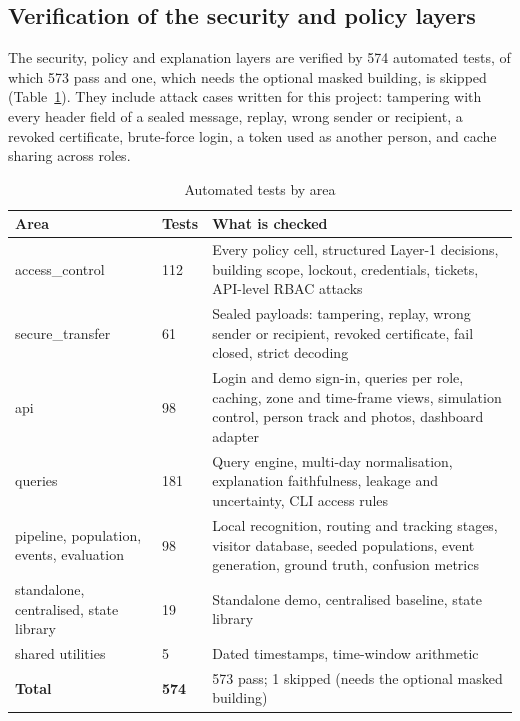 \documentclass[12pt,a4paper,oneside]{report}
\begin{document}
\subsection{Verification of the security and policy layers}\label{sec:res-security}
The security, policy and explanation layers are verified by 574 automated tests, of which 573 pass and one, which needs the optional masked building, is skipped (Table~\ref{tab:tests}). They include attack cases written for this project: tampering with every header field of a sealed message, replay, wrong sender or recipient, a revoked certificate, brute-force login, a token used as another person, and cache sharing across roles.

\begin{table}[htbp]
\centering
\caption{Automated tests by area}\label{tab:tests}
{\small\setlength{\tabcolsep}{4pt}\renewcommand{\arraystretch}{1.2}
\begin{tabular}{|p{4.50cm}|p{1.37cm}|p{8.41cm}|}\hline
\textbf{Area} & \textbf{Tests} & \textbf{What is checked}\\\hline
access\_\allowbreak control & 112 & Every policy cell, structured Layer-1 decisions, building scope, lockout, credentials, tickets, API-level RBAC attacks\\\hline
secure\_\allowbreak transfer & 61 & Sealed payloads: tampering, replay, wrong sender or recipient, revoked certificate, fail closed, strict decoding\\\hline
api & 98 & Login and demo sign-in, queries per role, caching, zone and time-frame views, simulation control, person track and photos, dashboard adapter\\\hline
queries & 181 & Query engine, multi-day normalisation, explanation faithfulness, leakage and uncertainty, CLI access rules\\\hline
pipeline, population, events, evaluation & 98 & Local recognition, routing and tracking stages, visitor database, seeded populations, event generation, ground truth, confusion metrics\\\hline
standalone, centralised, state library & 19 & Standalone demo, centralised baseline, state library\\\hline
shared utilities & 5 & Dated timestamps, time-window arithmetic\\\hline
\textbf{Total} & \textbf{574} & 573 pass; 1 skipped (needs the optional masked building)\\\hline
\end{tabular}}
\end{table}
\end{document}

